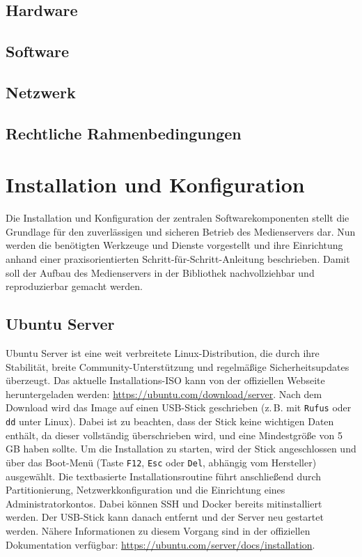 \documentclass[12pt,a4paper]{report}
\begin{document}
  \subsection{Hardware}
  \subsection{Software}
  \subsection{Netzwerk}
  \subsection{Rechtliche Rahmenbedingungen}
\section{Installation und Konfiguration}  
Die Installation und Konfiguration der zentralen Softwarekomponenten stellt die Grundlage für den zuverlässigen und sicheren Betrieb des Medienservers dar.
Nun werden die benötigten Werkzeuge und Dienste vorgestellt und ihre Einrichtung anhand einer praxisorientierten Schritt-für-Schritt-Anleitung beschrieben.
Damit soll der Aufbau des Medienservers in der Bibliothek nachvollziehbar und reproduzierbar gemacht werden.

  \subsection{Ubuntu Server}  
  Ubuntu Server ist eine weit verbreitete Linux-Distribution, die durch ihre Stabilität, breite Community-Unterstützung und regelmäßige Sicherheitsupdates überzeugt.  
  Das aktuelle Installations-ISO kann von der offiziellen Webseite heruntergeladen werden: \url{https://ubuntu.com/download/server}.  
  Nach dem Download wird das Image auf einen USB-Stick geschrieben (z.\,B. mit \texttt{Rufus} oder \texttt{dd} unter Linux).  
  Dabei ist zu beachten, dass der Stick keine wichtigen Daten enthält, da dieser vollständig überschrieben wird, und eine Mindestgröße von 5\,GB haben sollte.    
  Um die Installation zu starten, wird der Stick angeschlossen und über das Boot-Menü (Taste \texttt{F12}, \texttt{Esc} oder \texttt{Del}, abhängig vom Hersteller) ausgewählt.  
  Die textbasierte Installationsroutine führt anschließend durch Partitionierung, Netzwerkkonfiguration und die Einrichtung eines Administratorkontos. 
  Dabei können SSH und Docker bereits mitinstalliert werden. Der USB-Stick kann danach entfernt und der Server neu gestartet werden.
  Nähere Informationen zu diesem Vorgang sind in der offiziellen Dokumentation verfügbar: \url{https://ubuntu.com/server/docs/installation}.
\end{document}

